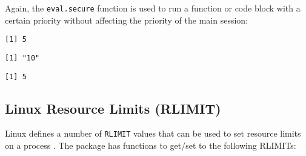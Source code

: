 Again, the \texttt{eval.secure} function is used to run a function or code block
with a certain priority without affecting the priority of the main \R session:

\begin{knitrout}\mycodesize
{}\color{fgcolor}\begin{kframe}
\begin{alltt}
\hlstd{()}
\end{alltt}
\begin{verbatim}
[1] 5
\end{verbatim}
\begin{alltt}
\hlstd{(}\hlstd{(}\hlstd{,}  \hlstd{=} \hlstd{),}  \hlstd{=} \hlstd{)}
\end{alltt}
\begin{verbatim}
[1] "10"
\end{verbatim}
\begin{alltt}
\hlstd{()}
\end{alltt}
\begin{verbatim}
[1] 5
\end{verbatim}
\end{kframe}
\end{knitrout}


\subsection{Linux Resource Limits (RLIMIT)}
\label{RLIMITS}

Linux defines a number of \texttt{RLIMIT} values that can be used to set
resource limits on a process \citep{linuxrlimit}. The \RAppArmor package
has functions to get/set to the following RLIMITs:

